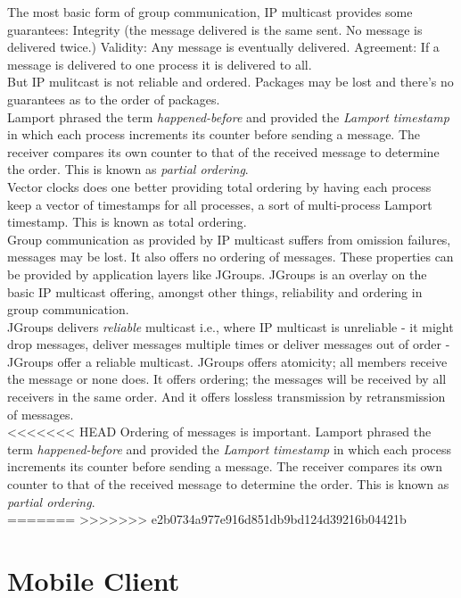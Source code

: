 The most basic form of group communication, IP multicast provides some guarantees: Integrity (the message delivered is the same sent. No message is delivered twice.) Validity: Any message is eventually delivered. Agreement: If a message is delivered to one process it is delivered to all.\\

But IP mulitcast is not reliable and ordered. Packages may be lost and there's no guarantees as to the order of packages.\\

Lamport phrased the term \emph{happened-before} and provided the \emph{Lamport timestamp} in which each process increments its counter before sending a message. The receiver compares its own counter to that of the received message to determine the order. This is known as \emph{partial ordering}.\\

Vector clocks does one better providing total ordering by having each process keep a vector of timestamps for all processes, a sort of multi-process Lamport timestamp. This is known as total ordering. \\

Group communication as provided by IP multicast suffers from omission failures, messages may be lost. It also offers no ordering of messages. These properties can be provided by application layers like JGroups. JGroups is an overlay on the basic IP multicast offering, amongst other things, reliability and ordering in group communication. \\

JGroups delivers \emph{reliable} multicast i.e., where IP multicast is unreliable - it might drop messages, deliver messages multiple times or deliver messages out of order - JGroups offer a reliable multicast. JGroups offers atomicity; all members receive the message or none does. It offers ordering; the messages will be received by all receivers in the same order. And it offers lossless transmission by retransmission of messages.\\

<<<<<<< HEAD
Ordering of messages is important. Lamport phrased the term \emph{happened-before} and provided the \emph{Lamport timestamp} in which each process increments its counter before sending a message. The receiver compares its own counter to that of the received message to determine the order. This is known as \emph{partial ordering}.\\
=======
>>>>>>> e2b0734a977e916d851db9bd124d39216b04421b



\section{Mobile Client}
